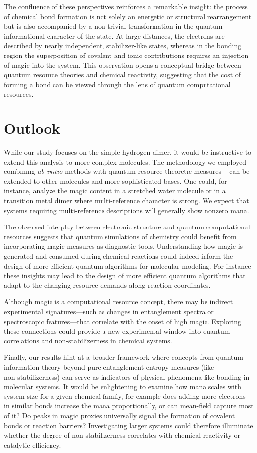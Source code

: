 \documentclass[aps, prl, twocolumn, groupedaddress, reprint, floatfix, nofootinbib, longbibliography]{revtex4-2}
\begin{document}
        The confluence of these perspectives reinforces a remarkable insight: the process of chemical bond formation is not solely an energetic or structural rearrangement but is also accompanied by a non‑trivial transformation in the quantum informational character of the state. At large distances, the electrons are described by nearly independent, stabilizer‑like states, whereas in the bonding region the superposition of covalent and ionic contributions requires an injection of magic into the system. This observation opens a conceptual bridge between quantum resource theories and chemical reactivity, suggesting that the cost of forming a bond can be viewed through the lens of quantum computational resources.

\section{Outlook}

    While our study focuses on the simple hydrogen dimer, it would be instructive to extend this analysis to more complex molecules. The methodology we employed – combining \textit{ab initio} methods with quantum resource-theoretic measures – can be extended to other molecules and more sophisticated bases. One could, for instance, analyze the magic content in a stretched water molecule or in a transition metal dimer where multi-reference character is strong. We expect that systems requiring multi-reference descriptions will generally show nonzero mana.

    The observed interplay between electronic structure and quantum computational resources suggests that quantum simulations of chemistry could benefit from incorporating magic measures as diagnostic tools. Understanding how magic is generated and consumed during chemical reactions could indeed inform the design of more efficient quantum algorithms for molecular modeling. For instance these insights may lead to the design of more efficient quantum algorithms that adapt to the changing resource demands along reaction coordinates.

    Although magic is a computational resource concept, there may be indirect experimental signatures—such as changes in entanglement spectra or spectroscopic features—that correlate with the onset of high magic. Exploring these connections could provide a new experimental window into quantum correlations and non-stabilizerness in chemical systems.

    Finally, our results hint at a broader framework where concepts from quantum information theory beyond pure entanglement entropy measures (like non‑stabilizerness) can serve as indicators of physical phenomena like bonding in molecular systems. It would be enlightening to examine how mana scales with system size for a given chemical family, for example does adding more electrons in similar bonds increase the mana proportionally, or can mean-field capture most of it? Do peaks in magic proxies universally signal the formation of covalent bonds or reaction barriers? Investigating larger systems could therefore illuminate whether the degree of non‑stabilizerness correlates with chemical reactivity or catalytic efficiency.
\end{document}
